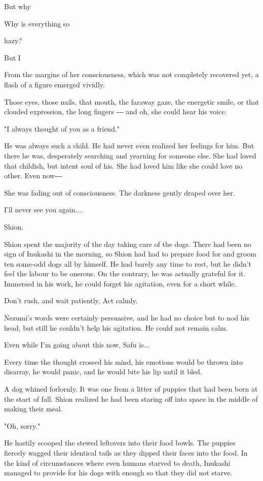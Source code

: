 But why

Why is everything so

hazy?

But I

From the margins of her consciousness, which was not completely
recovered yet, a flash of a figure emerged vividly.

Those eyes, those nails, that mouth, the faraway gaze, the energetic
smile, or that clouded expression, the long fingers ― and oh, she could
hear his voice.

"I always thought of you as a friend."

He was always such a child. He had never even realized her feelings for
him. But there he was, desperately searching and yearning for someone
else. She had loved that childish, but intent soul of his. She had loved
him like she could love no other. Even now―

She was fading out of consciousness. The darkness gently draped over
her.

I'll never see you again....

Shion.

Shion spent the majority of the day taking care of the dogs. There had
been no sign of Inukashi in the morning, so Shion had had to prepare
food for and groom ten some-odd dogs all by himself. He had barely any
time to rest, but he didn't feel the labour to be onerous. On the
contrary, he was actually grateful for it. Immersed in his work, he
could forget his agitation, even for a short while.

Don't rush, and wait patiently. Act calmly.

Nezumi's words were certainly persuasive, and he had no choice but to
nod his head, but still he couldn't help his agitation. He could not
remain calm.

Even while I'm going about this now, Safu is...

Every time the thought crossed his mind, his emotions would be thrown
into disarray, he would panic, and he would bite his lip until it bled.

A dog whined forlornly. It was one from a litter of puppies that had
been born at the start of fall. Shion realized he had been staring off
into space in the middle of making their meal.

"Oh, sorry."

He hastily scooped the stewed leftovers into their food bowls. The
puppies fiercely wagged their identical tails as they dipped their faces
into the food. In the kind of circumstances where even humans starved to
death, Inukashi managed to provide for his dogs with enough so that they
did not starve.

